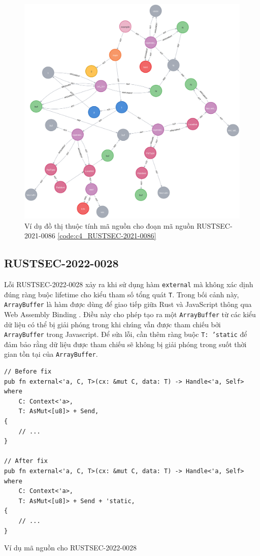 \begin{figure}[H]
    \includegraphics[width=1\columnwidth]{figures/c4/c4_RUSTSEC-2021-0086}
    \centering
    \caption{Ví dụ đồ thị thuộc tính mã nguồn cho đoạn mã nguồn RUSTSEC-2021-0086 \ref{code:c4_RUSTSEC-2021-0086}}
    \label{img:c4_RUSTSEC-2021-0086}
\end{figure}

\subsection{RUSTSEC-2022-0028}

Lỗi RUSTSEC-2022-0028 xảy ra khi sử dụng hàm \texttt{external} mà không xác dịnh đúng ràng buộc lifetime cho kiểu tham số tổng quát \texttt{T}. Trong bối cảnh này, \texttt{ArrayBuffer} là hàm được dùng để giao tiếp giữa Rust và JavaScript thông qua Web Assembly Binding \cite{haas2017bringing, githubGitHubRustwasmwasmbindgen}. Điều này cho phép tạo ra một \texttt{ArrayBuffer} từ các kiểu dữ liệu có thể bị giải phóng trong khi chúng vẫn được tham chiếu bởi \texttt{ArrayBuffer} trong Javascript. Để sửa lỗi, cần thêm ràng buộc \texttt{T: 'static} để đảm bảo rằng dữ liệu được tham chiếu sẽ không bị giải phóng trong suốt thời gian tồn tại của \texttt{ArrayBuffer}.

\begin{listing}[H]
\begin{verbatim}
// Before fix
pub fn external<'a, C, T>(cx: &mut C, data: T) -> Handle<'a, Self>
where
    C: Context<'a>,
    T: AsMut<[u8]> + Send,
{
    // ...
}

// After fix
pub fn external<'a, C, T>(cx: &mut C, data: T) -> Handle<'a, Self>
where
    C: Context<'a>,
    T: AsMut<[u8]> + Send + 'static,
{
    // ...
}
\end{verbatim}
\caption{Ví dụ mã nguồn cho RUSTSEC-2022-0028}
\label{code:c4_RUSTSEC-2022-0028}
\end{listing}

